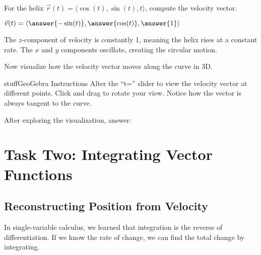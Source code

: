 \documentclass{ximera}
\begin{document}
\begin{problem}
For the helix $\vec{r}(t) = \langle \cos(t), \sin(t), t \rangle$, compute the velocity vector.

$\vec{v}(t) = \langle \answer{-\sin(t)}, \answer{\cos(t)}, \answer{1} \rangle$

\begin{feedback}
The $z$-component of velocity is constantly 1, meaning the helix rises at a constant rate. The $x$ and $y$ components oscillate, creating the circular motion.
\end{feedback}
\end{problem}

\begin{problem}
Now visualize how the velocity vector moves along the curve in 3D.

\begin{expandable}{stuff}{GeoGebra Instructions}
    Alter the ``t='' slider to view the velocity vector at different points. Click and drag to rotate your view. Notice how the vector is always tangent to the curve.
\end{expandable}

\begin{center}
\end{center}

After exploring the visualization, answer:
\begin{selectAll}
\end{selectAll}
\end{problem}

\section*{Task Two: Integrating Vector Functions}

\subsection*{Reconstructing Position from Velocity}

In single-variable calculus, we learned that integration is the reverse of differentiation. If we know the rate of change, we can find the total change by integrating.
\end{document}
